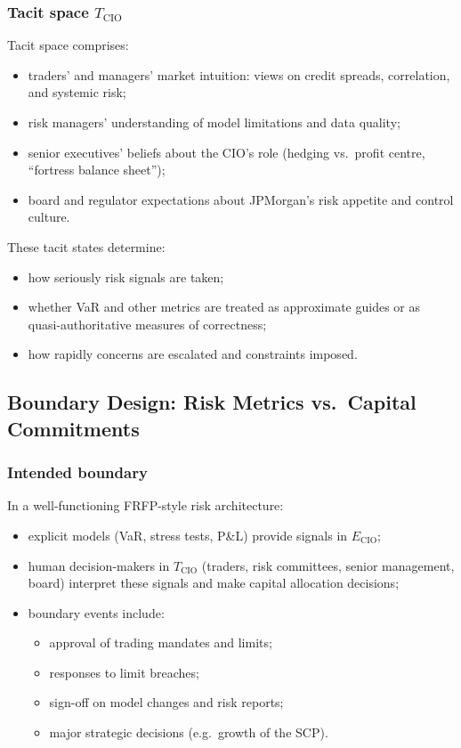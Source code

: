 \subsubsection*{Tacit space \(T_{\mathrm{CIO}}\)}

Tacit space comprises:

\begin{itemize}
  \item traders’ and managers’ market intuition:
        views on credit spreads, correlation, and systemic risk;
  \item risk managers’ understanding of model limitations and data quality;
  \item senior executives’ beliefs about the CIO’s role
        (hedging vs.\ profit centre, ``fortress balance sheet'');
  \item board and regulator expectations about JPMorgan’s risk appetite and
        control culture.
\end{itemize}

These tacit states determine:

\begin{itemize}
  \item how seriously risk signals are taken;
  \item whether VaR and other metrics are treated as approximate guides or
        as quasi-authoritative measures of correctness;
  \item how rapidly concerns are escalated and constraints imposed.
\end{itemize}

\subsection{Boundary Design: Risk Metrics vs.\ Capital Commitments}

\subsubsection*{Intended boundary}

In a well-functioning FRFP-style risk architecture:

\begin{itemize}
  \item explicit models (VaR, stress tests, P\&L) provide signals in
        \(E_{\mathrm{CIO}}\);
  \item human decision-makers in \(T_{\mathrm{CIO}}\)
        (traders, risk committees, senior management, board)
        interpret these signals and make capital allocation decisions;
  \item boundary events include:
        \begin{itemize}
          \item approval of trading mandates and limits;
          \item responses to limit breaches;
          \item sign-off on model changes and risk reports;
          \item major strategic decisions (e.g.\ growth of the SCP).
        \end{itemize}
\end{itemize}

